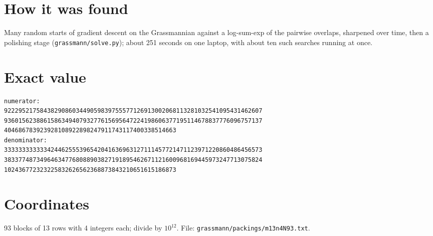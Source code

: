 \documentclass[11pt,a4paper]{article}
\begin{document}
\section{How it was found}
Many random starts of gradient descent on the Grassmannian against a log-sum-exp of the pairwise overlaps, sharpened over time, then a polishing stage (\texttt{grassmann/solve.py}); about 251 seconds on one laptop, with about ten such searches running at once.


\appendix
\section{Exact value}
{\small
\begin{verbatim}
numerator:
922295217584382908603449059839755577126913002068113281032541095431462607
936015623886158634940793277615695647224198606377195114678837776096757137
404686783923928108922898247911743117400338514663
denominator:
333333333333424462555396542041636963127111457721471123971220860486456573
383377487349646347768088903827191895462671121600968169445973247713075824
102436772323225832626562368873843210651615186873
\end{verbatim}}

\section{Coordinates}
93 blocks of 13 rows with 4 integers each; divide by $10^{12}$. File: \texttt{grassmann/packings/m13n4N93.txt}.
{\tiny
\begin{multicols}{3}
\end{multicols}}
\end{document}
